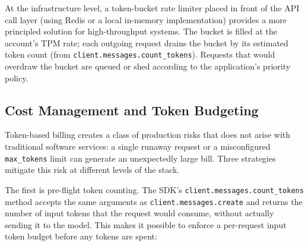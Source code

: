 At the infrastructure level, a token-bucket rate limiter placed in front of the API
call layer (using Redis or a local in-memory implementation) provides a more
principled solution for high-throughput systems. The bucket is filled at the account's
TPM rate; each outgoing request drains the bucket by its estimated token count (from
\texttt{client.messages.count\_tokens}). Requests that would overdraw the bucket are
queued or shed according to the application's priority policy.

\subsection{Cost Management and Token Budgeting}
\label{app:sdk-commercial:production:cost}

Token-based billing creates a class of production risks that does not arise with
traditional software services: a single runaway request or a misconfigured
\texttt{max\_tokens} limit can generate an unexpectedly large bill. Three strategies
mitigate this risk at different levels of the stack.

The first is pre-flight token counting. The SDK's \texttt{client.messages.count\_tokens}
method accepts the same arguments as \texttt{client.messages.create} and returns the
number of input tokens that the request would consume, without actually sending it to
the model. This makes it possible to enforce a per-request input token budget before
any tokens are spent:

